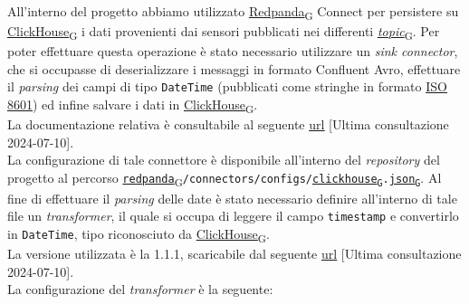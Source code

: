 All'interno del progetto abbiamo utilizzato \href{https://7last.github.io/docs/pb/documentazione-interna/glossario\#redpanda}{Redpanda\textsubscript{G}} Connect per persistere su \href{https://7last.github.io/docs/pb/documentazione-interna/glossario\#clickhouse}{ClickHouse\textsubscript{G}} i dati provenienti dai sensori pubblicati nei differenti \href{https://7last.github.io/docs/pb/documentazione-interna/glossario\#topic}{\textit{topic}\textsubscript{G}}. Per
poter effettuare questa operazione è stato necessario utilizzare un \textit{sink connector}, che si occupasse di deserializzare i messaggi in formato Confluent Avro, effettuare
il \textit{parsing} dei campi di tipo \texttt{DateTime} (pubblicati come stringhe in formato \href{https://www.iso.org/iso-8601-date-and-time-format.html}{\underline{ISO 8601}})
ed infine salvare i dati in \href{https://7last.github.io/docs/pb/documentazione-interna/glossario\#clickhouse}{ClickHouse\textsubscript{G}}.\\
La documentazione relativa è consultabile al seguente \href{https://clickhouse.com/docs/en/integrations/kafka/clickhouse-kafka-connect-sink}{\underline{url}}
[Ultima consultazione 2024-07-10].\\
La configurazione di tale connettore è disponibile all'interno del \textit{repository} del progetto al percorso \href{https://7last.github.io/docs/pb/documentazione-interna/glossario\#redpanda}{\texttt{redpanda}\textsubscript{G}}\texttt{/connectors/configs/\href{https://7last.github.io/docs/pb/documentazione-interna/glossario\#clickhouse}{clickhouse\textsubscript{G}}.\href{https://7last.github.io/docs/pb/documentazione-interna/glossario\#javascript-object-notation}{json\textsubscript{G}}}.
Al fine di effettuare il \textit{parsing} delle date è stato necessario definire all'interno di tale file un \textit{transformer}, il quale si occupa di leggere il campo \texttt{timestamp}
e convertirlo in \texttt{DateTime}, tipo riconosciuto da \href{https://7last.github.io/docs/pb/documentazione-interna/glossario\#clickhouse}{ClickHouse\textsubscript{G}}.\\
La versione utilizzata è la 1.1.1, scaricabile dal seguente \href{https://github.com/ClickHouse/clickhouse-kafka-connect/releases}{\underline{url}} [Ultima consultazione 2024-07-10].\\
La configurazione del \textit{transformer} è la seguente:
